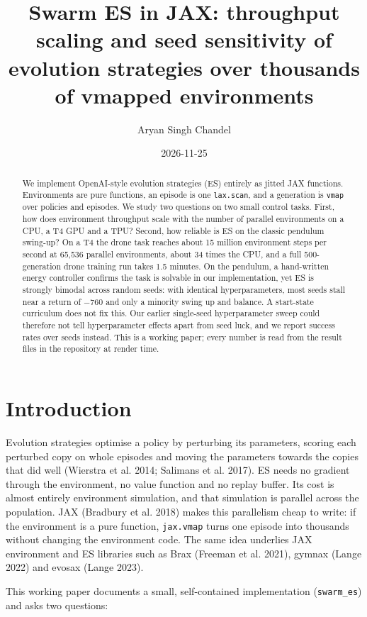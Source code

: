 \documentclass[
]{article}
\title{Swarm ES in JAX: throughput scaling and seed sensitivity of
evolution strategies over thousands of vmapped environments}
\author{Aryan Singh Chandel}
\date{2026-11-25}
\begin{document}
\maketitle
\begin{abstract}
We implement OpenAI-style evolution strategies (ES) entirely as jitted
JAX functions. Environments are pure functions, an episode is one
\texttt{lax.scan}, and a generation is \texttt{vmap} over policies and
episodes. We study two questions on two small control tasks. First, how
does environment throughput scale with the number of parallel
environments on a CPU, a T4 GPU and a TPU? Second, how reliable is ES on
the classic pendulum swing-up? On a T4 the drone task reaches about 15
million environment steps per second at 65,536 parallel environments,
about 34 times the CPU, and a full 500-generation drone training run
takes 1.5 minutes. On the pendulum, a hand-written energy controller
confirms the task is solvable in our implementation, yet ES is strongly
bimodal across random seeds: with identical hyperparameters, most seeds
stall near a return of −760 and only a minority swing up and balance. A
start-state curriculum does not fix this. Our earlier single-seed
hyperparameter sweep could therefore not tell hyperparameter effects
apart from seed luck, and we report success rates over seeds instead.
This is a working paper; every number is read from the result files in
the repository at render time.
\end{abstract}


\section{Introduction}\label{introduction}

Evolution strategies optimise a policy by perturbing its parameters,
scoring each perturbed copy on whole episodes and moving the parameters
towards the copies that did well (Wierstra et al. 2014; Salimans et al.
2017). ES needs no gradient through the environment, no value function
and no replay buffer. Its cost is almost entirely environment
simulation, and that simulation is parallel across the population. JAX
(Bradbury et al. 2018) makes this parallelism cheap to write: if the
environment is a pure function, \texttt{jax.vmap} turns one episode into
thousands without changing the environment code. The same idea underlies
JAX environment and ES libraries such as Brax (Freeman et al. 2021),
gymnax (Lange 2022) and evosax (Lange 2023).

This working paper documents a small, self-contained implementation
(\texttt{swarm\_es}) and asks two questions:
\end{document}
